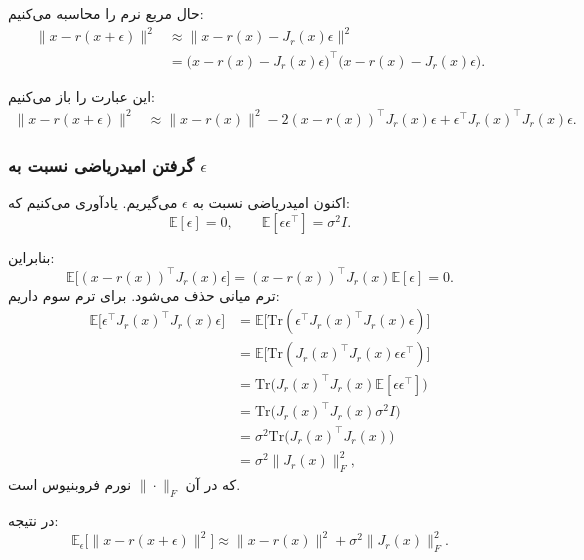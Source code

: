 \documentclass{article}
\begin{document}
حال مربع نرم را محاسبه می‌کنیم:
\begin{align}
	\|x - r(x+\epsilon)\|^2
	&\approx
	\big\|
	x - r(x) - J_r(x)\epsilon
	\big\|^2
	\\
	&=
	\big(x - r(x) - J_r(x)\epsilon\big)^\top
	\big(x - r(x) - J_r(x)\epsilon\big).
\end{align}

این عبارت را باز می‌کنیم:
\begin{align}
	\|x - r(x+\epsilon)\|^2
	&\approx
	\|x - r(x)\|^2
	- 2 (x - r(x))^\top J_r(x)\epsilon
	+
	\epsilon^\top J_r(x)^\top J_r(x)\epsilon.
\end{align}

\subsubsection{گرفتن امیدریاضی نسبت به $\epsilon$}

اکنون امیدریاضی نسبت به $\epsilon$ می‌گیریم. یادآوری می‌کنیم که:
\begin{equation}
	\mathbb{E}[\epsilon] = 0, \qquad
	\mathbb{E}[\epsilon\epsilon^\top] = \sigma^2 I.
\end{equation}

بنابراین:
\begin{equation}
	\mathbb{E}\big[ (x - r(x))^\top J_r(x)\epsilon \big] = (x - r(x))^\top J_r(x) \mathbb{E}[\epsilon] = 0.
\end{equation}
ترم میانی حذف می‌شود. برای ترم سوم داریم:
\begin{align}
	\mathbb{E}\big[\epsilon^\top J_r(x)^\top J_r(x)\epsilon\big]
	&=
	\mathbb{E}\big[ \text{Tr}(\epsilon^\top J_r(x)^\top J_r(x)\epsilon) \big]
	\\
	&=
	\mathbb{E}\big[ \text{Tr}(J_r(x)^\top J_r(x)\epsilon\epsilon^\top) \big]
	\\
	&=
	\text{Tr}\big(
	J_r(x)^\top J_r(x)
	\mathbb{E}[\epsilon\epsilon^\top]
	\big)
	\\
	&=
	\text{Tr}\big(
	J_r(x)^\top J_r(x) \sigma^2 I
	\big)
	\\
	&=
	\sigma^2 \text{Tr}\big(
	J_r(x)^\top J_r(x)
	\big)
	\\
	&=
	\sigma^2 \|J_r(x)\|_F^2,
\end{align}
که در آن $\|\cdot\|_F$ نورم فروبنیوس است.

در نتیجه:
\begin{equation}
	\mathbb{E}_\epsilon
	\big[
	\|x - r(x+\epsilon)\|^2
	\big]
	\approx
	\|x - r(x)\|^2
	+
	\sigma^2 \|J_r(x)\|_F^2.
\end{equation}
\end{document}
